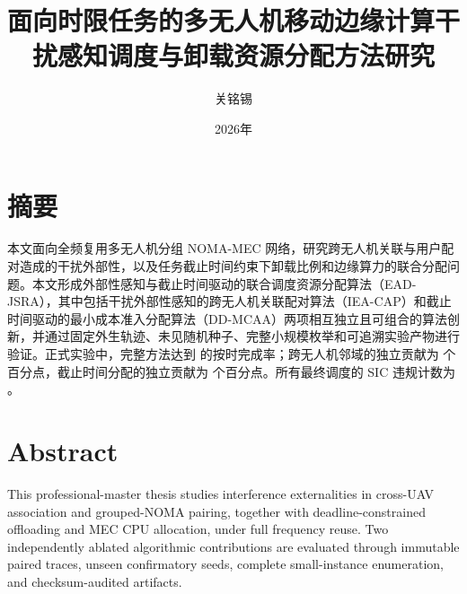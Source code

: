 \documentclass[UTF8,openany]{ctexbook}
\title{面向时限任务的多无人机移动边缘计算干扰感知调度与卸载资源分配方法研究}
\author{关铭锡}
\date{2026年}
\begin{document}
\frontmatter
\maketitle
\chapter*{摘要}
本文面向全频复用多无人机分组 NOMA-MEC 网络，研究跨无人机关联与用户配对造成的干扰外部性，以及任务截止时间约束下卸载比例和边缘算力的联合分配问题。本文形成外部性感知与截止时间驱动的联合调度资源分配算法（EAD-JSRA），其中包括干扰外部性感知的跨无人机关联配对算法（IEA-CAP）和截止时间驱动的最小成本准入分配算法（DD-MCAA）两项相互独立且可组合的算法创新，并通过固定外生轨迹、未见随机种子、完整小规模枚举和可追溯实验产物进行验证。正式实验中，完整方法达到 \FullOnTimePercent{} 的按时完成率；跨无人机邻域的独立贡献为 \InnovationOneCrossGainPP{} 个百分点，截止时间分配的独立贡献为 \InnovationTwoGainPP{} 个百分点。所有最终调度的 SIC 违规计数为 \SICViolationCount{}。
\chapter*{Abstract}
This professional-master thesis studies interference externalities in cross-UAV association and grouped-NOMA pairing, together with deadline-constrained offloading and MEC CPU allocation, under full frequency reuse. Two independently ablated algorithmic contributions are evaluated through immutable paired traces, unseen confirmatory seeds, complete small-instance enumeration, and checksum-audited artifacts.
\tableofcontents
\mainmatter








\backmatter


\end{document}
